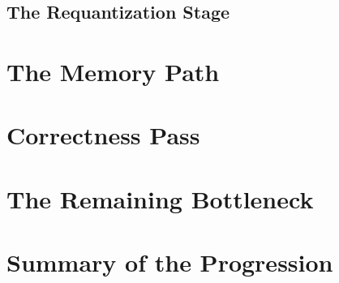 \subsection{The Requantization Stage}
\label{sec:pipeline-requant}

\section{The Memory Path}
\label{sec:phase3}

\section{Correctness Pass}
\label{sec:phase4}

\section{The Remaining Bottleneck}
\label{sec:dd023}

\section{Summary of the Progression}
\label{sec:timing-summary}
